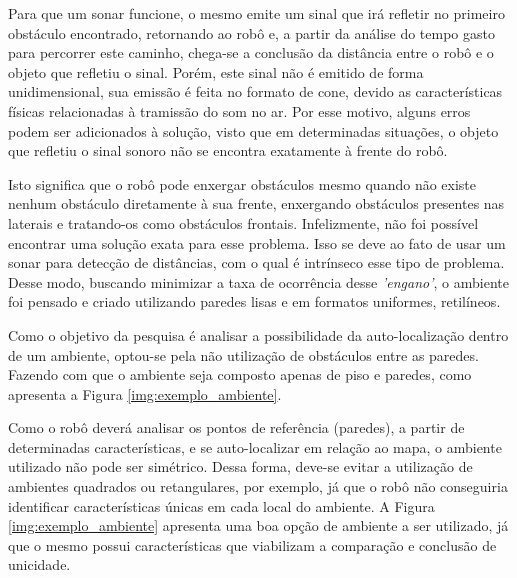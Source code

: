 	Para que um sonar funcione, o mesmo emite um sinal que irá refletir no primeiro obstáculo encontrado, retornando ao robô e, a partir da análise do tempo gasto para percorrer este caminho, chega-se a conclusão da distância entre o robô e o objeto que refletiu o sinal. Porém, este sinal não é emitido de forma unidimensional, sua emissão é feita no formato de cone, devido as características físicas relacionadas à tramissão do som no ar. Por esse motivo, alguns erros podem ser adicionados à solução, visto que em determinadas situações, o objeto que refletiu o sinal sonoro não se encontra exatamente à frente do robô.

	Isto significa que o robô pode enxergar obstáculos mesmo quando não existe nenhum obstáculo diretamente à sua frente, enxergando obstáculos presentes nas laterais e tratando-os como obstáculos frontais.
	Infelizmente, não foi possível encontrar uma solução exata para esse problema. Isso se deve ao fato de usar um sonar para detecção de distâncias, com o qual é intrínseco esse tipo de problema.
	Desse modo, buscando minimizar a taxa de ocorrência desse \textit{'engano'}, o ambiente foi pensado e criado utilizando paredes lisas e em formatos uniformes, retilíneos.

	Como o objetivo da pesquisa é analisar a possibilidade da auto-localização dentro de um ambiente, optou-se pela não utilização de obstáculos entre as paredes. Fazendo com que o ambiente seja composto apenas de piso e paredes, como apresenta a Figura \ref{img:exemplo_ambiente}.

	Como o robô deverá analisar os pontos de referência (paredes), a partir de determinadas características, e se auto-localizar em
	relação ao mapa, o ambiente utilizado não pode ser simétrico. Dessa forma, deve-se evitar a utilização de ambientes quadrados ou retangulares, por exemplo, já que o robô não conseguiria identificar características únicas em cada local do ambiente.
	A Figura \ref{img:exemplo_ambiente} apresenta uma boa opção de ambiente a ser utilizado, já que o mesmo possui características que viabilizam a comparação e conclusão de unicidade.

